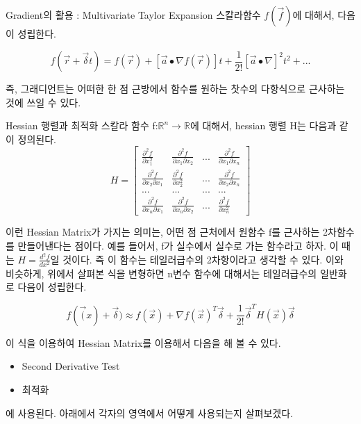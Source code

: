 \documentclass{beamer}
\begin{document}
\begin{frame}{Gradient의 활용 : Multivariate Taylor Expansion} 
스칼라함수 $f(\vec{f})$에 대해서, 다음이 성립한다. 

\begin{equation} 
f(\vec{r} + \vec{\delta}t) = f(\vec{r}) + [\vec{a} \bullet \nabla f(\vec{r}) ] t  + \frac{1}{2!} [\vec{a} \bullet \nabla ]^2 t^2 + ... 
\end{equation} 

즉, 그래디언트는 어떠한 한 점 근방에서 함수를 원하는 찻수의 다항식으로 근사하는 것에 쓰일 수 있다. 

\end{frame}

\begin{frame}[allowframebreaks]{Hessian 행렬과 최적화}  
스칼라 함수 f:$\mathds{R}^n \rightarrow \mathds{R}$에 대해서, hessian 행렬 H는 다음과 같이 정의된다. 
\begin{equation} 
H = \left[ \begin{matrix} 
\frac{\partial^2 f}{\partial x_1^2} & \frac{\partial^2 f}{\partial x_1 \partial x_2} & ... & \frac{\partial^2 f}{\partial x_1 \partial x_n} \\ 
\frac{\partial^2 f}{\partial x_2 \partial x_1} & \frac{\partial^2 f}{\partial x_2^2} & ... & \frac{\partial^2 f}{\partial x_2 \partial x_n} \\ 
... & ... & ... & ... \\
\frac{\partial^2 f}{\partial x_n \partial x_1} & \frac{\partial^2 f}{\partial x_n \partial x_2} & ... & \frac{\partial^2 f}{\partial x_n^2} \end{matrix} \right] 
\end{equation} 

이런 Hessian Matrix가 가지는 의미는, 어떤 점 근처에서 원함수 f를 근사하는 2차함수를 만들어낸다는 점이다. 예를 들어서, f가 실수에서 실수로 가는 함수라고 하자. 이 때는 $H = \frac{d^2f}{dx^2}$일 것이다. 즉 이 함수는 테일러급수의 2차항이라고 생각할 수 있다. 이와 비슷하게, 위에서 살펴본 식을 변형하면 n변수 함수에 대해서는 테일러급수의 일반화로 다음이 성립한다. 

\begin{equation} 
f(\vec(x)+\vec{\delta}) \approx f(\vec{x}) + \nabla f(\vec{x})^T \vec{\delta} + \frac{1}{2!} \vec{\delta}^T H(\vec{x}) \vec{\delta}
\end{equation}

이 식을 이용하여 Hessian Matrix를 이용해서 다음을 해 볼 수 있다. 

\begin{itemize} 
\item Second Derivative Test 
\item 최적화
\end{itemize}
에 사용된다. 아래에서 각자의 영역에서 어떻게 사용되는지 살펴보겠다. 


\end{frame}
\end{document}
